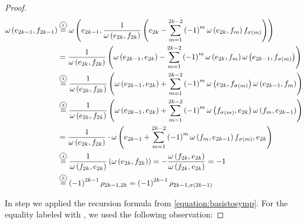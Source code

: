 \documentclass[../SymplecticSimplices.tex]{subfiles}
\begin{document}
\begin{proof}
  \begin{equation*}
    \begin{split}
      \omega \left( e_{2k-1}, f_{2k-1} \right) & \eqcom{1} \omega \left( e_{2k-1}, \frac{1}{\omega \left( e_{2k}, f_{2k} \right)} \left( e_{2k} - \sum \limits _{m=1}^{2k-2} \left( -1 \right)^{m} \omega \left( e_{2k}, f_m \right) f_{\sigma \left( m \right)} \right) \right) \\
                                               & = \frac{1}{\omega \left( e_{2k}, f_{2k} \right)} \left( \omega \left( e_{2k-1}, e_{2k} \right) - \sum \limits _{m=1}^{2k-2} \left( -1 \right)^{m} \omega \left( e_{2k}, f_m \right) \omega \left( e_{2k-1}, f_{\sigma \left( m \right)} \right) \right) \\
                                               & \eqcom{2} \frac{1}{\omega \left( e_{2k}, f_{2k} \right)} \left( \omega \left( e_{2k-1}, e_{2k} \right) + \sum \limits _{m=1}^{2k-2} \left( -1 \right)^{m} \omega \left( e_{2k}, f_{\sigma \left( m \right)} \right) \omega \left( e_{2k-1}, f_m \right) \right) \\
                                               & \eqcom{3} \frac{1}{\omega \left( e_{2k}, f_{2k} \right)} \left( \omega \left( e_{2k-1}, e_{2k} \right) + \sum \limits _{m=1}^{2k-2} \left( -1 \right)^{m} \omega \left( f_{\sigma \left( m \right)}, e_{2k} \right) \omega \left( f_{m}, e_{2k-1} \right) \right) \\
                                               & = \frac{1}{\omega \left( e_{2k}, f_{2k} \right)} \cdot \omega \left( e_{2k-1} + \sum \limits _{m=1}^{2k-2} \left( -1 \right)^{m} \omega \left( f_{m}, e_{2k-1} \right) f_{\sigma \left( m \right)}, e_{2k} \right) \\
                                               & \eqcom{4} \frac{1}{\omega \left( f_{2k}, e_{2k} \right)} \left( \omega \left( e_{2k}, f_{2k} \right) \right) = - \frac{\omega \left( f_{2k}, e_{2k} \right)}{\omega \left( f_{2k}, e_{2k} \right)} = -1 \\
                                               & \eqcom{5} \left( -1 \right)^{2k-1} \rho_{2k-1, 2k} = \left( -1 \right)^{2k-1} \rho_{2k-1, \sigma \left( 2k-1 \right) } \\
    \end{split}
  \end{equation*}

  In step  we applied the recursion formula from \eqref{equation:basistosymp}. For the equality labeled with , we used the following observation:


\end{proof}
\end{document}
